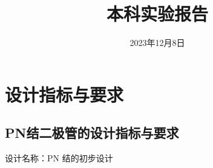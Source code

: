 \documentclass{zjureport}
\title{本科实验报告}
\date{2023年12月8日}
\begin{document}
\makecover








\section{设计指标与要求}
\subsection{PN结二极管的设计指标与要求}
设计名称：PN 结的初步设计
\end{document}
